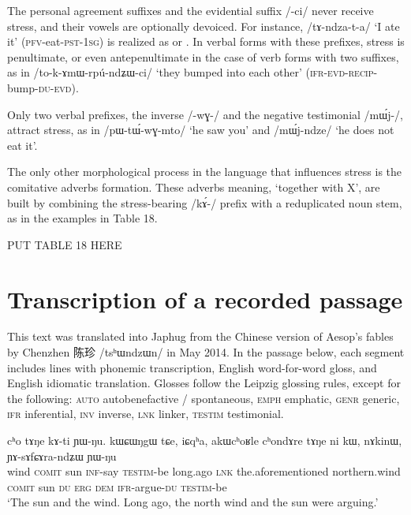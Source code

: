 \documentclass[12pt]{article}
\newcommand{\ipa}[1]{\mbox{\phon/#1/}}
\newcommand{\phonet}[1]{\mbox{\phon[#1]}}
\newcommand{\ipab}[1]{{\phon#1}}
\newcommand{\zh}[1]{{\cn #1}}
\newcommand{\gltt}{ \vspace{-1em}  \glt}
\begin{document}
The personal agreement suffixes and the evidential suffix \ipa{-ci} never receive stress, and their vowels are optionally devoiced. For instance, \ipa{tɤ-ndza-t-a} `I ate it' (\textsc{pfv}-eat-\textsc{pst-1sg}) is realized as \phonet{tɤndzátḁ} or \phonet{tɤndzáta}. In verbal forms with these prefixes, stress is penultimate, or even antepenultimate in the case of verb forms with two suffixes, as in \ipa{to-k-ɤmɯ-rpú-ndʑɯ-ci} `they bumped into each other' (\textsc{ifr}-\textsc{evd}-\textsc{recip}-bump-\textsc{du-evd}).

Only two verbal prefixes, the inverse \ipa{-wɣ-} and the negative testimonial \ipa{mɯ́j-}, attract stress, as in \ipa{pɯ-tɯ́-wɣ-mto} `he saw you' and \ipa{mɯ́j-ndze} `he does not eat it'.
    
The only other morphological process in the language that influences stress is the comitative adverbs formation. These adverbs meaning, `together with X', are built by combining the stress-bearing \ipa{kɤ́-}  prefix with a reduplicated noun stem, as in the examples in Table 18.

 PUT TABLE 18 HERE
   
     \section*{Transcription of a recorded passage}
   This text was translated into Japhug from the Chinese version of Aesop's fables by Chenzhen \zh{陈珍} \ipa{tsʰɯndzɯn} in May 2014. In the passage below, each segment includes lines with phonemic transcription, English word-for-word gloss, and English idiomatic translation. Glosses follow the Leipzig glossing rules, except for the following: \textsc{auto} autobenefactive / spontaneous, \textsc{emph} emphatic, \textsc{genr} generic, \textsc{ifr} inferential, \textsc{inv} inverse, \textsc{lnk} linker, \textsc{testim} testimonial.
   
 
\begin{myexe} 
\gll  \ipab{qale} \ipab{cʰo} \ipab{tɤŋe} \ipab{kɤ-ti} \ipab{ɲɯ-ŋu.} \ipab{kɯɕɯŋgɯ} \ipab{tɕe,} \ipab{iɕqʰa,} \ipab{akɯcʰoʁle}   \ipab{cʰondɤre} \ipab{tɤŋe} \ipab{ni} \ipab{kɯ,} \ipab{nɤkinɯ,} \ipab{ɲɤ-sɤfɕɤra-ndʑɯ} \ipab{ɲɯ-ŋu}\\ 
 wind \textsc{comit} sun    \textsc{inf}-say \textsc{testim}-be   long.ago     \textsc{lnk}  the.aforementioned northern.wind  \textsc{comit}     sun    \textsc{du}  \textsc{erg} \textsc{dem} \textsc{ifr}-argue-\textsc{du}    \textsc{testim}-be\\ 
 \gltt  `The sun and the wind. Long ago, the north wind and the sun were arguing.'
\end{myexe} 
 
\end{document}
